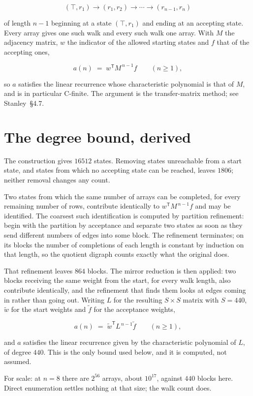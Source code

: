 \documentclass[11pt]{article}
\theoremstyle{definition}
\begin{document}
\[(\top,r_1) \to (r_1,r_2) \to \cdots \to (r_{n-1},r_n)\]

of length $n-1$ beginning at a state $(\top,r_1)$ and ending at an accepting state. Every array gives one such walk and every such walk one array. With $M$ the adjacency matrix, $w$ the indicator of the allowed starting states and $f$ that of the accepting ones,

\[a(n) \;=\; w^{\mathsf T} M^{\,n-1} f \qquad (n \ge 1),\]

so $a$ satisfies the linear recurrence whose characteristic polynomial is that of $M$, and is in particular C-finite. The argument is the transfer-matrix method; see Stanley~\S4.7.

\section{The degree bound, derived}

The construction gives $16512$ states. Removing states unreachable from a start state, and states from which no accepting state can be reached, leaves $1806$; neither removal changes any count.

Two states from which the same number of arrays can be completed, for every remaining number of rows, contribute identically to $w^{\mathsf T}M^{\,n-1}f$ and may be identified. The coarsest such identification is computed by partition refinement: begin with the partition by acceptance and separate two states as soon as they send different numbers of edges into some block. The refinement terminates; on its blocks the number of completions of each length is constant by induction on that length, so the quotient digraph counts exactly what the original does.

That refinement leaves $864$ blocks. The mirror reduction is then applied: two blocks receiving the same weight from the start, for every walk length, also contribute identically, and the refinement that finds them looks at edges coming in rather than going out. Writing $L$ for the resulting $S \times S$ matrix with $S = 440$, $\tilde w$ for the start weights and $\tilde f$ for the acceptance weights,

\[a(n) \;=\; \tilde w^{\mathsf T} L^{\,n-1} \tilde f \qquad (n \ge 1),\]

and $a$ satisfies the linear recurrence given by the characteristic polynomial of $L$, of degree $440$. This is the only bound used below, and it is computed, not assumed.

For scale: at $n = 8$ there are $2^{56}$ arrays, about $10^{17}$, against $440$ blocks here. Direct enumeration settles nothing at that size; the walk count does.
\end{document}
